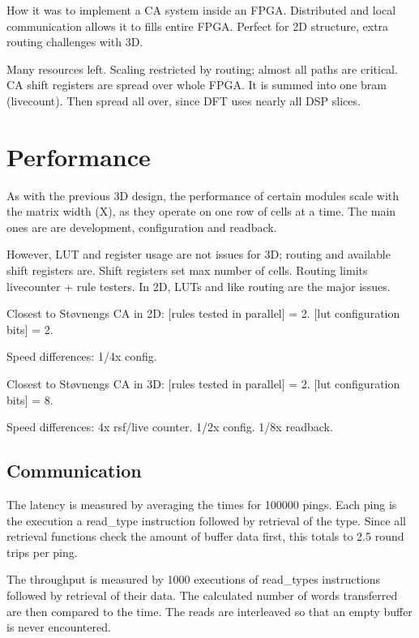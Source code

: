 \TODO
How it was to implement a CA system inside an FPGA.
Distributed and local communication allows it to fills entire FPGA.
Perfect for 2D structure, extra routing challenges with 3D.

\TODO
Many resources left.
Scaling restricted by routing; almost all paths are critical.
CA shift registers are spread over whole FPGA.
It is summed into one bram (livecount).
Then spread all over, since DFT uses nearly all DSP slices.


\section{Performance}

\TODO

As with the previous 3D design, the performance of certain modules scale with the matrix width (X), as they operate on one row of cells at a time.
The main ones are are development, configuration and readback.

However, LUT and register usage are not issues for 3D; routing and available shift registers are.
Shift registers set max number of cells.
Routing limits livecounter + rule testers.
In 2D, LUTs and like routing are the major issues.

Closest to Støvnengs CA in 2D:
[rules tested in parallel] = 2.
[lut configuration bits] = 2.

Speed differences:
1/4x config.

Closest to Støvnengs CA in 3D:
[rules tested in parallel] = 2.
[lut configuration bits] = 8.

Speed differences:
4x rsf/live counter.
1/2x config.
1/8x readback.


\subsection{Communication}


The latency is measured by averaging the times for 100000 pings.
Each ping is the execution a read\_type instruction followed by retrieval of the type.
Since all retrieval functions check the amount of buffer data first, this totals to 2.5 round trips per ping.

The throughput is measured by 1000 executions of read\_types instructions followed by retrieval of their data.
The calculated number of words transferred are then compared to the time.
The reads are interleaved so that an empty buffer is never encountered.

